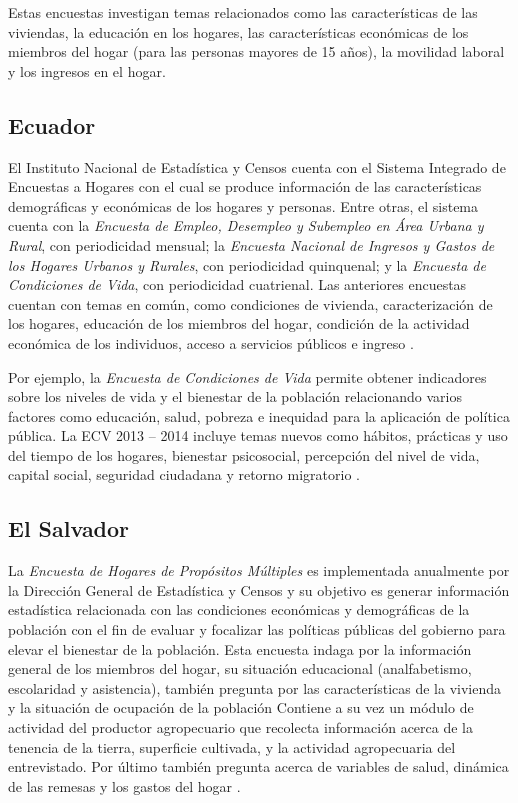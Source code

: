 \documentclass[
  10pt,
  spanish,
]{book}
\begin{document}
Estas encuestas investigan temas relacionados como las características de las viviendas, la educación en los hogares, las características económicas de los miembros del hogar (para las personas mayores de 15 años), la movilidad laboral y los ingresos en el hogar.

\hypertarget{ecuador}{%
\subsection*{Ecuador}\label{ecuador}}

El Instituto Nacional de Estadística y Censos cuenta con el Sistema Integrado de Encuestas a Hogares con el cual se produce información de las características demográficas y económicas de los hogares y personas. Entre otras, el sistema cuenta con la \emph{Encuesta de Empleo, Desempleo y Subempleo en Área Urbana y Rural}, con periodicidad mensual; la \emph{Encuesta Nacional de Ingresos y Gastos de los Hogares Urbanos y Rurales}, con periodicidad quinquenal; y la \emph{Encuesta de Condiciones de Vida}, con periodicidad cuatrienal. Las anteriores encuestas cuentan con temas en común, como condiciones de vivienda, caracterización de los hogares, educación de los miembros del hogar, condición de la actividad económica de los individuos, acceso a servicios públicos e ingreso \citep{INEC-EC}.

Por ejemplo, la \emph{Encuesta de Condiciones de Vida} permite obtener indicadores sobre los niveles de vida y el bienestar de la población relacionando varios factores como educación, salud, pobreza e inequidad para la aplicación de política pública. La ECV 2013 -- 2014 incluye temas nuevos como hábitos, prácticas y uso del tiempo de los hogares, bienestar psicosocial, percepción del nivel de vida, capital social, seguridad ciudadana y retorno migratorio \citep{INEC2-EC}.

\hypertarget{el-salvador}{%
\subsection*{El Salvador}\label{el-salvador}}

La \emph{Encuesta de Hogares de Propósitos Múltiples} es implementada anualmente por la Dirección General de Estadística y Censos y su objetivo es generar información estadística relacionada con las condiciones económicas y demográficas de la población con el fin de evaluar y focalizar las políticas públicas del gobierno para elevar el bienestar de la población. Esta encuesta indaga por la información general de los miembros del hogar, su situación educacional (analfabetismo, escolaridad y asistencia), también pregunta por las características de la vivienda y la situación de ocupación de la población Contiene a su vez un módulo de actividad del productor agropecuario que recolecta información acerca de la tenencia de la tierra, superficie cultivada, y la actividad agropecuaria del entrevistado. Por último también pregunta acerca de variables de salud, dinámica de las remesas y los gastos del hogar \citep{DIGESTYC-SV}.
\end{document}
